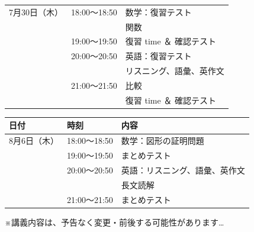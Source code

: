\begin{tabular}{l l p{6cm}}
      \midrule
       {7月30日（木）}  & 18:00～18:50 & 数学：復習テスト \\
                      &              & \qquad\;\; 関数\\
                      & 19:00～19:50 & \qquad\;\; 復習 time ＆ 確認テスト \\
                      & 20:00～20:50 & 英語：復習テスト \\
                      &              & \qquad\;\; リスニング、語彙、英作文\\
                      & 21:00～21:50 & \qquad\;\; 比較\\
                      &              & \qquad\;\; 復習 time ＆ 確認テスト \\
      \bottomrule
    \end{tabular}

  \newpage
  \begin{tabular}{l l p{6cm}}
      \toprule
      \textbf{日付} & \textbf{時刻} & \textbf{内容} \\
      \midrule
        {8月6日（木）} & 18:00～18:50 & 数学：図形の証明問題\\
                      & 19:00～19:50 & \qquad\;\;まとめテスト\\
                      & 20:00～20:50 & 英語：リスニング、語彙、英作文\\
                      &              & \qquad\;\; 長文読解\\
                      & 21:00～21:50 & \qquad\;\; まとめテスト\\
      \bottomrule
    \end{tabular}
    \vspace{1em}

    ※講義内容は、予告なく変更・前後する可能性があります…
